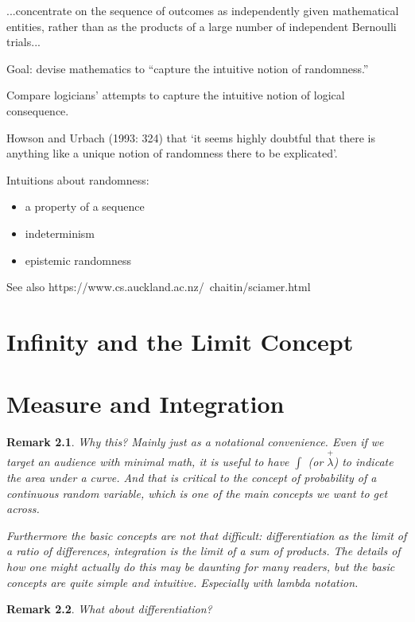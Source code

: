 \documentclass[reqno,12pt]{tufte-book}
\numberwithin{equation}{subsection}
\newtheorem{remark}{Remark}
\begin{document}
...concentrate on the sequence of outcomes as independently given mathematical entities, rather than as the products of a large number of independent Bernoulli trials...


Goal: devise mathematics to ``capture the intuitive notion of randomness.''

Compare logicians' attempts to capture the intuitive notion of logical consequence.

 Howson and Urbach (1993: 324) that ‘it seems highly doubtful that there is anything like a unique notion of randomness there to be explicated’.

Intuitions about randomness:

\begin{itemize}
\item a property of a sequence
\item indeterminism
\item epistemic randomness
\end{itemize}


See also https://www.cs.auckland.ac.nz/~chaitin/sciamer.html

\chapter{Infinity and the Limit Concept}

\chapter{Measure and Integration}

\begin{remark}
  Why this?  Mainly just as a notational convenience.  Even if we target an
  audience with minimal math, it is useful to have $\int$ (or
  $\overset{+}{\lambda}$) to indicate the area under a curve.  And
  that is critical to the concept of probability of a continuous
  random variable, which is one of the main concepts we want to get
  across.

  Furthermore the basic concepts are not that difficult:
  differentiation as the limit of a ratio of differences, integration
  is the limit of a sum of products.  The details of how one might
  actually do this may be daunting for many readers, but the basic
  concepts are quite simple and intuitive.  Especially with lambda
  notation.
\end{remark}

\begin{remark}
  What about differentiation?
\end{remark}
\end{document}
